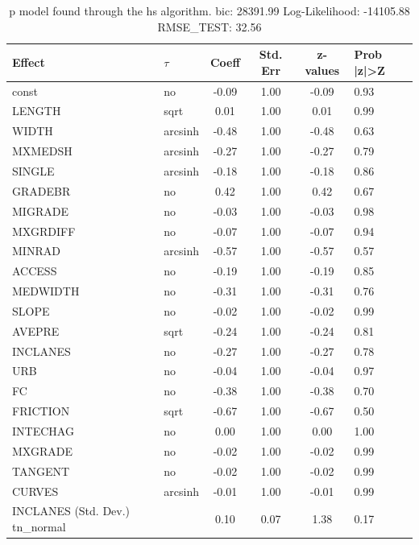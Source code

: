 \begin{table}
	\caption{p model found through the hs algorithm. bic: 28391.99 Log-Likelihood: -14105.88 RMSE_TEST: 32.56}
	\begin{center}
		\begin{tabular}{|l|l|c|c|c|l|}
			\hline
			Effect & $\tau$ & Coeff & Std. Err & z-values & Prob |z|>Z \\
			\hline
			const & no & -0.09 & 1.00 & -0.09 & 0.93 \\
			\hline
			LENGTH & sqrt & 0.01 & 1.00 & 0.01 & 0.99 \\
			\hline
			WIDTH & arcsinh & -0.48 & 1.00 & -0.48 & 0.63 \\
			\hline
			MXMEDSH & arcsinh & -0.27 & 1.00 & -0.27 & 0.79 \\
			\hline
			SINGLE & arcsinh & -0.18 & 1.00 & -0.18 & 0.86 \\
			\hline
			GRADEBR & no & 0.42 & 1.00 & 0.42 & 0.67 \\
			\hline
			MIGRADE & no & -0.03 & 1.00 & -0.03 & 0.98 \\
			\hline
			MXGRDIFF & no & -0.07 & 1.00 & -0.07 & 0.94 \\
			\hline
			MINRAD & arcsinh & -0.57 & 1.00 & -0.57 & 0.57 \\
			\hline
			ACCESS & no & -0.19 & 1.00 & -0.19 & 0.85 \\
			\hline
			MEDWIDTH & no & -0.31 & 1.00 & -0.31 & 0.76 \\
			\hline
			SLOPE & no & -0.02 & 1.00 & -0.02 & 0.99 \\
			\hline
			AVEPRE & sqrt & -0.24 & 1.00 & -0.24 & 0.81 \\
			\hline
			INCLANES & no & -0.27 & 1.00 & -0.27 & 0.78 \\
			\hline
			URB & no & -0.04 & 1.00 & -0.04 & 0.97 \\
			\hline
			FC & no & -0.38 & 1.00 & -0.38 & 0.70 \\
			\hline
			FRICTION & sqrt & -0.67 & 1.00 & -0.67 & 0.50 \\
			\hline
			INTECHAG & no & 0.00 & 1.00 & 0.00 & 1.00 \\
			\hline
			MXGRADE & no & -0.02 & 1.00 & -0.02 & 0.99 \\
			\hline
			TANGENT & no & -0.02 & 1.00 & -0.02 & 0.99 \\
			\hline
			CURVES & arcsinh & -0.01 & 1.00 & -0.01 & 0.99 \\
			\hline
			INCLANES (Std. Dev.) tn_normal &  & 0.10 & 0.07 & 1.38 & 0.17 \\

\end{tabular}
\end{center}
\end{table}
